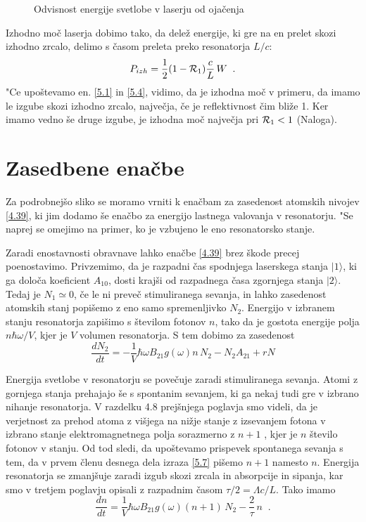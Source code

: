 \begin{figure}[tbp]
\label{s5.2} \vskip 5cm
\caption{Odvisnost energije svetlobe v laserju od ojačenja}
\end{figure}

Izhodno moč laserja dobimo tako, da delež energije, ki gre na en prelet
skozi izhodno zrcalo, delimo s časom preleta preko resonatorja $L/c$: 
\begin{equation}
P_{izh}=\frac{1}{2}(1-{\cal {R}}_{1})\frac{c}{L}\,W\;\;.  \label{5.6}
\end{equation}
"Ce upoštevamo en. \ref{5.1} in \ref{5.4}, vidimo, da je izhodna moč v
primeru, da imamo le izgube skozi izhodno zrcalo, največja, če je
reflektivnost čim bliže 1. Ker imamo vedno še druge izgube, je izhodna
moč največja pri ${\cal {R}}_{1}<1$ (Naloga).

\section{Zasedbene enačbe}

Za podrobnejšo sliko se moramo vrniti k enačbam za zasedenost atomskih
nivojev \ref{4.39}, ki jim dodamo še enačbo za energijo lastnega valovanja
v resonatorju. "Se naprej se omejimo na primer, ko je vzbujeno le eno
resonatorsko stanje.

Zaradi enostavnosti obravnave lahko enačbe \ref{4.39} brez škode precej
poenostavimo. Privzemimo, da je razpadni čas spodnjega laserskega stanja $%
|1\rangle$, ki ga določa koeficient $A_{10}$, dosti krajši od razpadnega
časa zgornjega stanja $|2\rangle$. Tedaj je $N_1\simeq0$, če le ni preveč
stimuliranega sevanja, in lahko zasedenost atomskih stanj popišemo z eno
samo spremenljivko $N_2$. Energijo v izbranem stanju resonatorja zapišimo s
števi\-lom fotonov $n$, tako da je gostota energije polja $n\hbar\omega/V$,
kjer je $V$ volumen resonatorja. S tem dobimo za zasedenost 
\begin{equation}  \label{5.7}
\frac{dN_2}{dt}=- \frac{1}{V}\hbar\omega B_{21}g(\omega)n\,N_2-N_2A_{21}+rN
\end{equation}

Energija svetlobe v resonatorju se povečuje zaradi stimuliranega sevanja.
Atomi z gornjega stanja prehajajo še s spontanim seva\-njem, ki ga nekaj
tudi gre v izbrano nihanje resonatorja. V razdelku 4.8 prejšnjega poglavja
smo videli, da je verjetnost za prehod atoma z višjega na nižje stanje z
izsevanjem fotona v izbrano stanje elektromagnetnega polja sorazmerno z $n+1$%
, kjer je $n$ število fotonov v stanju. Od tod sledi, da upoštevamo
prispevek spontanega sevanja s tem, da v prvem členu desnega dela izraza 
\ref{5.7} pišemo $n+1$ namesto $n$. Energija resonatorja se zmanjšuje
zaradi izgub skozi zrcala in absorpcije in sipanja, kar smo v tretjem
poglavju opisali z razpadnim časom $\tau/2=\Lambda c/L$. Tako imamo 
\begin{equation}  \label{5.8}
\frac{dn}{dt}=\frac{1}{V}\hbar\omega B_{21}g(\omega)(n+1)\, N_2-\frac{2}{\tau%
}\,n\;\;.
\end{equation}


